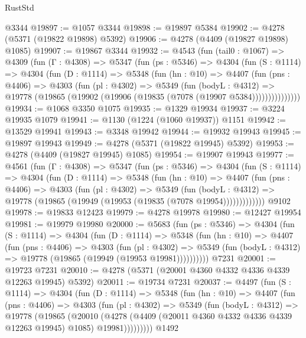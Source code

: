 \begin{lexlean}{RustStd}
\begin{coremodule}
    @3344
@19897 := @1057 @3344
@19898 := @19897 @5384
@19902 := @4278 (@5371 (@19822 @19898) @5392)
@19906 := @4278 (@4409 (@19827 @19898) @1085)
@19907 := @19867 @3344
@19932 := @4543
    (fun (tail0 : @1067) =>
    @4309
      (fun (Γ : @4308) =>
      @5347
        (fun (ps : @5346) =>
        @4304
          (fun (S : @1114) =>
          @4304
            (fun (D : @1114) =>
            @5348
              (fun (hn : @10) =>
              @4407
                (fun (pns : @4406) =>
                @4303
                  (fun (pl : @4302) =>
                  @5349
                    (fun (bodyL : @4312) =>
                    @19778 (@19865 (@19902 (@19906 (@19835 (@7078 (@19907 @5384)))))))))))))))
@19934 := @1068 @3350 @1075
@19935 := @1329 @19934
@19937 := @3224 @19935 @1079
@19941 := @1130 (@1224 (@1060 @19937)) @1151
@19942 := @13529 @19941
@19943 := @3348 @19942
@19944 := @19932 @19943
@19945 := @19897 @19943
@19949 := @4278 (@5371 (@19822 @19945) @5392)
@19953 := @4278 (@4409 (@19827 @19945) @1085)
@19954 := @19907 @19943
@19977 := @4561
    (fun (Γ : @4308) =>
    @5347
      (fun (ps : @5346) =>
      @4304
        (fun (S : @1114) =>
        @4304
          (fun (D : @1114) =>
          @5348
            (fun (hn : @10) =>
            @4407
              (fun (pns : @4406) =>
              @4303
                (fun (pl : @4302) =>
                @5349
                  (fun (bodyL : @4312) =>
                  @19778 (@19865 (@19949 (@19953 (@19835 (@7078 @19954)))))))))))))
    @9102
@19978 := @19833 @12423
@19979 := @4278 @19978
@19980 := @12427 @19954
@19981 := @19979 @19980
@20000 := @5683
    (fun (ps : @5346) =>
    @4304
      (fun (S : @1114) =>
      @4304
        (fun (D : @1114) =>
        @5348
          (fun (hn : @10) =>
          @4407
            (fun (pns : @4406) =>
            @4303
              (fun (pl : @4302) =>
              @5349 (fun (bodyL : @4312) => @19778 (@19865 (@19949 (@19953 @19981))))))))))
    @7231
@20001 := @19723 @7231
@20010 := @4278 (@5371 (@20001 @4360 @4332 @4336 @4339 @12263 @19945) @5392)
@20011 := @19734 @7231
@20037 := @4497
    (fun (S : @1114) =>
    @4304
      (fun (D : @1114) =>
      @5348
        (fun (hn : @10) =>
        @4407
          (fun (pns : @4406) =>
          @4303
            (fun (pl : @4302) =>
            @5349
              (fun (bodyL : @4312) =>
              @19778
                (@19865
                  (@20010
                    (@4278
                      (@4409 (@20011 @4360 @4332 @4336 @4339 @12263 @19945) @1085)
                      @19981)))))))))
    @1492

\end{coremodule}
\end{lexlean}

